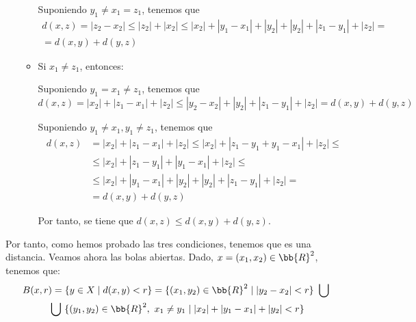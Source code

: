 \begin{ejercicio}
\begin{enumerate}
\begin{itemize}
            Suponiendo $y_1\neq x_1=z_1$, tenemos que
            \begin{multline*}
                d(x,z)=|z_2-x_2| \leq |z_2| + |x_2|\leq |x_2| + |y_1-x_1| + |y_2| + |y_2| + |z_1-y_1| + |z_2| =\\= d(x,y) + d(y,z)
            \end{multline*}

            \item Si $x_1\neq z_1$, entonces:
            
            Suponiendo $y_1=x_1\neq z_1$, tenemos que
            \begin{equation*}
                d(x,z)=|x_2| + |z_1-x_1| + |z_2|
                \leq |y_2-x_2| + |y_2| + |z_1-y_1| + |z_2| = d(x,y) + d(y,z)
            \end{equation*}

            Suponiendo $y_1\neq x_1, y_1\neq z_1$, tenemos que
            \begin{equation*}
                \begin{split}
                    d(x,z)&
                    =|x_2| + |z_1-x_1| + |z_2|
                    \leq |x_2| + |z_1-y_1+y_1-x_1| + |z_2|
                    \leq \\&
                    \leq |x_2| + |z_1-y_1| + |y_1-x_1| + |z_2|
                    \leq \\&
                    \leq |x_2| + |y_1-x_1| + |y_2| + |y_2| + |z_1-y_1| + |z_2|
                    =\\&= d(x,y) + d(y,z)
                \end{split}
            \end{equation*}

            Por tanto, se tiene que $d(x,z)\leq d(x,y) + d(y,z)$.
        \end{itemize}
    \end{enumerate}

    Por tanto, como hemos probado las tres condiciones, tenemos que es una distancia. 
    Veamos ahora las bolas abiertas. Dado, $x=(x_1, x_2)\in \bb{R}^2$, tenemos que:
    \begin{multline*}
        B(x,r) = \{y\in X\mid d(x,y)<r\} = \{(x_1, y_2)\in \bb{R}^2 \mid  |y_2-x_2|<r\} ~\bigcup~\\ \bigcup ~ \{(y_1, y_2)\in \bb{R}^2,~x_1\neq y_1 \mid  |x_2| + |y_1-x_1| + |y_2|<r\}
    \end{multline*}
\end{ejercicio}


